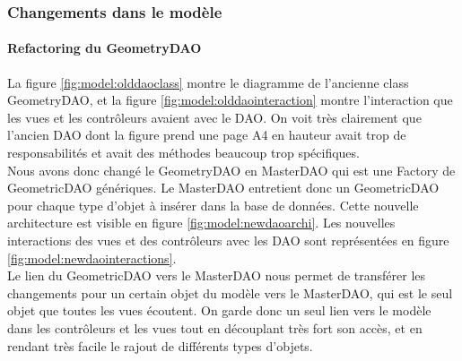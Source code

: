 	\subsubsection{Changements dans le modèle}

		\paragraph{Refactoring du GeometryDAO}
		La figure \ref{fig:model:olddaoclass} montre le diagramme de l'ancienne
		class GeometryDAO, et la figure \ref{fig:model:olddaointeraction} montre
		l'interaction que les vues et les contrôleurs avaient avec le DAO. On
		voit très clairement que l'ancien DAO dont la figure prend une page A4
		en hauteur avait trop de responsabilités et avait des méthodes beaucoup
		trop spécifiques.\\

		Nous avons donc changé le GeometryDAO en MasterDAO qui est une Factory de 
		GeometricDAO génériques. Le MasterDAO entretient donc un GeometricDAO pour chaque
		type d'objet à insérer dans la base de données. Cette nouvelle architecture 
		est visible en figure \ref{fig:model:newdaoarchi}. Les nouvelles interactions
		des vues et des contrôleurs avec les DAO sont représentées en figure
		\ref{fig:model:newdaointeractions}.\\

		Le lien du GeometricDAO vers le MasterDAO nous permet de transférer les changements
		pour un certain objet du modèle vers le MasterDAO, qui est le seul objet
		que toutes les vues écoutent. On garde donc un seul lien vers le modèle
		dans les contrôleurs et les vues tout en découplant très fort son accès,
		et en rendant très facile le rajout de différents types d'objets.\\

